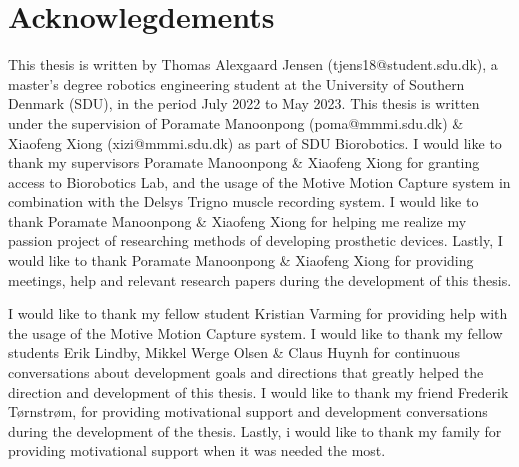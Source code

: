 \documentclass[../main.tex]{subfiles}
\begin{document}
\section*{Acknowlegdements}

This thesis is written by Thomas Alexgaard Jensen (tjens18@student.sdu.dk), a master's degree robotics engineering student at the University of Southern Denmark (SDU), in the period July 2022 to May 2023.
This thesis is written under the supervision of Poramate Manoonpong (poma@mmmi.sdu.dk) \& Xiaofeng Xiong (xizi@mmmi.sdu.dk) as part of SDU Biorobotics.
I would like to thank my supervisors Poramate Manoonpong \& Xiaofeng Xiong for granting access to Biorobotics Lab, and the usage of the Motive Motion Capture system in combination with the Delsys Trigno muscle recording system.
I would like to thank Poramate Manoonpong \& Xiaofeng Xiong for helping me realize my passion project of researching methods of developing prosthetic devices.
Lastly, I would like to thank Poramate Manoonpong \& Xiaofeng Xiong for providing meetings, help and relevant research papers during the development of this thesis.

I would like to thank my fellow student Kristian Varming for providing help with the usage of the Motive Motion Capture system.
I would like to thank my fellow students Erik Lindby, Mikkel Werge Olsen \& Claus Huynh for continuous conversations about development goals and directions that greatly helped the direction and development of this thesis.
I would like to thank my friend Frederik Tørnstrøm, for providing motivational support and development conversations during the development of the thesis.
Lastly, i would like to thank my family for providing motivational support when it was needed the most.
\end{document}
